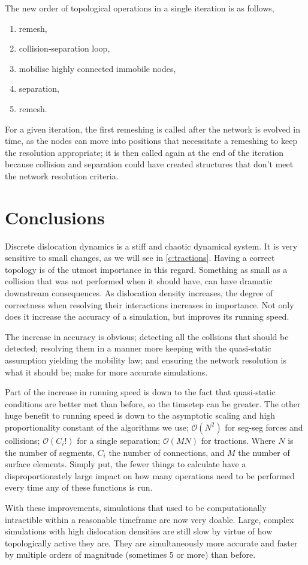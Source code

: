 The new order of topological operations in a single iteration is as follows,
\begin{enumerate}
    \item remesh,
    \item collision-separation loop,
    \item mobilise highly connected immobile nodes,
    \item separation,
    \item remesh.
\end{enumerate}
For a given iteration, the first remeshing is called after the network is evolved in time, as the nodes can move into positions that necessitate a remeshing to keep the resolution appropriate; it is then called again at the end of the iteration because collision and separation could have created structures that don't meet the network resolution criteria.

\section{Conclusions}

Discrete dislocation dynamics is a stiff and chaotic dynamical system. It is very sensitive to small changes, as we will see in \cref{c:tractions}. Having a correct topology is of the utmost importance in this regard. Something as small as a collision that was not performed when it should have, can have dramatic downstream consequences. As dislocation density increases, the degree of correctness when resolving their interactions increases in importance. Not only does it increase the accuracy of a simulation, but improves its running speed.

The increase in accuracy is obvious; detecting all the collsions that should be detected; resolving them in a manner more keeping with the quasi-static assumption yielding the mobility law; and ensuring the network resolution is what it should be; make for more accurate simulations.

Part of the increase in running speed is down to the fact that quasi-static conditions are better met than before, so the timsetep can be greater. The other huge benefit to running speed is down to the asymptotic scaling and high proportionality constant of the algorithms we use; $\mathcal{O}(N^2)$ for seg-seg forces and collisions; $\mathcal{O}(C_i!)$ for a single separation; $\mathcal{O}(M N)$ for tractions. Where $N$ is the number of segments, $C_i$ the number of connections, and $M$ the number of surface elements. Simply put, the fewer things to calculate have a disproportionately large impact on how many operations need to be performed every time any of these functions is run.

With these improvements, simulations that used to be computationally intractible within a reasonable timeframe are now very doable. Large, complex simulations with high dislocation densities are still slow by virtue of how topologically active they are. They are simultaneously more accurate and faster by multiple orders of magnitude (sometimes 5 or more) than before.
\savearabiccounter
